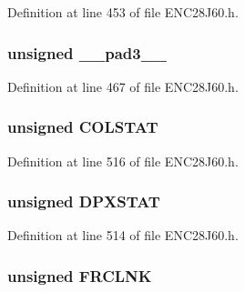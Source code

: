 Definition at line 453 of file E\+N\+C28\+J60.\+h.

\hypertarget{union_p_h_y_r_e_g_ad7d7cee33e0c7f447abc4d171c628dd4}{}
\subsubsection[{\+\_\+\+\_\+pad3\+\_\+\+\_\+}]{\setlength{\rightskip}{0pt plus 5cm}unsigned \+\_\+\+\_\+pad3\+\_\+\+\_\+}\label{union_p_h_y_r_e_g_ad7d7cee33e0c7f447abc4d171c628dd4}


Definition at line 467 of file E\+N\+C28\+J60.\+h.

\hypertarget{union_p_h_y_r_e_g_a3ee305362bb37bcca3fca2f3c03d75f3}{}
\subsubsection[{C\+O\+L\+S\+T\+A\+T}]{\setlength{\rightskip}{0pt plus 5cm}unsigned C\+O\+L\+S\+T\+A\+T}\label{union_p_h_y_r_e_g_a3ee305362bb37bcca3fca2f3c03d75f3}


Definition at line 516 of file E\+N\+C28\+J60.\+h.

\hypertarget{union_p_h_y_r_e_g_abeed5e6674e8d88ee8204c721523dc19}{}
\subsubsection[{D\+P\+X\+S\+T\+A\+T}]{\setlength{\rightskip}{0pt plus 5cm}unsigned D\+P\+X\+S\+T\+A\+T}\label{union_p_h_y_r_e_g_abeed5e6674e8d88ee8204c721523dc19}


Definition at line 514 of file E\+N\+C28\+J60.\+h.

\hypertarget{union_p_h_y_r_e_g_ac906758e9c4b1f3179adae909c4156ac}{}
\subsubsection[{F\+R\+C\+L\+N\+K}]{\setlength{\rightskip}{0pt plus 5cm}unsigned F\+R\+C\+L\+N\+K}\label{union_p_h_y_r_e_g_ac906758e9c4b1f3179adae909c4156ac}


